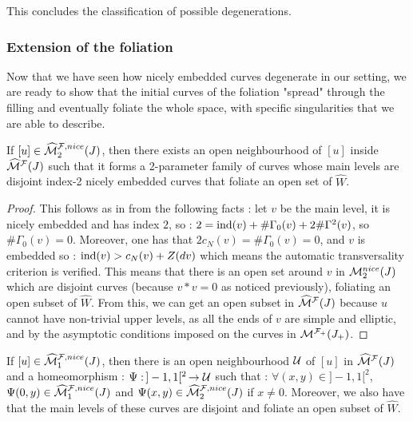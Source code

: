 \documentclass[../main.tex]{subfiles}
\begin{document}
This concludes the classification of possible degenerations. 


\subsubsection{Extension of the foliation}
Now that we have seen how nicely embedded curves degenerate in our setting, we are ready to show that the initial curves of the foliation "spread" through the filling and eventually foliate the whole space, with specific singularities that we are able to describe. \\

\begin{lemma}
If $[u]\in \widehat{\mathcal{M}}^{\mathcal{F},nice}_2(J)$, then there exists an open neighbourhood of $[u]$ inside $\widehat{\mathcal{M}}^{\mathcal{F}}(J)$ such that it forms a 2-parameter family of curves whose main levels are disjoint index-2 nicely embedded curves that foliate an open set of $\widehat{W}$.
\end{lemma}

\begin{proof}
This follows as in \cite{SOBD2} from the following facts : let $v$ be the main level, it is nicely embedded and has index $2$, so : $2 = \text{ind}(v) + \#\Gamma_0(v) + 2\#\Gamma^2(v)$, so $\#\Gamma_0(v) = 0$. Moreover, one has that $2c_N(v) = \#\Gamma_0(v) = 0$, and $v$ is embedded so : $\text{ind}(v) > c_N(v) + Z(dv)$ which means the automatic transversality criterion is verified. This means that there is an open set around $v$ in $\mathcal{M}^{nice}_2(J)$ which are disjoint curves (because $v*v = 0$ as noticed previously), foliating an open subset of $\widehat{W}$. From this, we can get an open subset in $\widehat{\mathcal{M}}^{\mathcal{F}}(J)$ because $u$ cannot have non-trivial upper levels, as all the ends of $v$ are simple and elliptic, and by the asymptotic conditions imposed on the curves in $\mathcal{M}^{\mathcal{F}_+}(J_+)$. 

\end{proof} 

\begin{lemma}
If $[u]\in\widehat{\mathcal{M}}^{\mathcal{F},nice}_1(J)$, then there is an open neighbourhood $\mathcal{U}$ of $[u]$ in $\widehat{\mathcal{M}}^{\mathcal{F}}(J)$ and a homeomorphism : $\Psi : \, ]-1,1[^2 \,\rightarrow \mathcal{U}$ such that : $\forall (x,y)\in ]-1,1[^2$, $\Psi(0,y)\in \widehat{\mathcal{M}}^{\mathcal{F},nice}_1(J)$ and $\Psi(x,y)\in \widehat{\mathcal{M}}^{\mathcal{F},nice}_2(J)$ if $x \neq 0$. Moreover, we also have that the main levels of these curves are disjoint and foliate an open subset of $\widehat{W}$.
\end{lemma}
\end{document}
